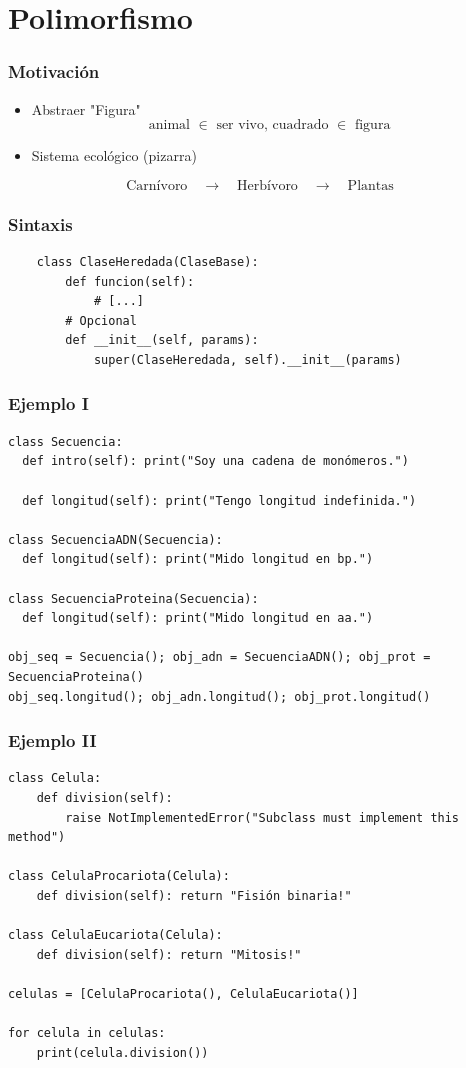 \documentclass[14pt,aspectratio=169,xcolor=dvipsnames]{beamer}
\begin{document}
\section{Polimorfismo}
\begin{frame}\frametitle{Motivación}
    \begin{itemize}
        \item Abstraer "Figura"
    \[ \text{animal $\in$ ser vivo, cuadrado $\in$ figura }\]
        \item Sistema ecológico (pizarra)
    \end{itemize}
    $$ \text{Carnívoro}\quad\to\quad\text{Herbívoro}\quad\to\quad\text{Plantas} $$
\end{frame}
\begin{frame}[fragile]\frametitle{Sintaxis}
    \begin{verbatim}
    class ClaseHeredada(ClaseBase):
        def funcion(self):
            # [...]
        # Opcional
        def __init__(self, params):
            super(ClaseHeredada, self).__init__(params)
    \end{verbatim}
\end{frame}
\begin{frame}[fragile]\frametitle{Ejemplo I}
    \begin{footnotesize}
    \begin{verbatim}
class Secuencia:
  def intro(self): print("Soy una cadena de monómeros.")
    
  def longitud(self): print("Tengo longitud indefinida.")
  
class SecuenciaADN(Secuencia):
  def longitud(self): print("Mido longitud en bp.")
    
class SecuenciaProteina(Secuencia):
  def longitud(self): print("Mido longitud en aa.")
    
obj_seq = Secuencia(); obj_adn = SecuenciaADN(); obj_prot = SecuenciaProteina()
obj_seq.longitud(); obj_adn.longitud(); obj_prot.longitud()
    \end{verbatim}
    \end{footnotesize}
\end{frame}
\begin{frame}[fragile]\frametitle{Ejemplo II}
    \begin{footnotesize}
    \begin{verbatim}
class Celula:
    def division(self):
        raise NotImplementedError("Subclass must implement this method")

class CelulaProcariota(Celula):
    def division(self): return "Fisión binaria!"

class CelulaEucariota(Celula):
    def division(self): return "Mitosis!"

celulas = [CelulaProcariota(), CelulaEucariota()]

for celula in celulas:
    print(celula.division())
    \end{verbatim}
    \end{footnotesize}
\end{frame}
\end{document}
